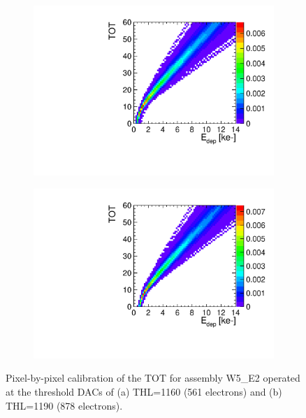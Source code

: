 \begin{figure}[htbp] \centering
  \begin{subfigure}[b]{0.45\textwidth}
    \includegraphics[width=\textwidth]{./figures/Calibration/TOTcalibration_W0005_E02_thresh1160.pdf}
    \caption{}
  \end{subfigure} \hfill
  \begin{subfigure}[b]{0.45\textwidth}
    \includegraphics[width=\textwidth]{./figures/Calibration/TOTcalibration_W0005_E02_thresh1190.pdf}
    \caption{}
  \end{subfigure}
  \caption{Pixel-by-pixel calibration of the TOT for assembly W5\_E2
    operated at the threshold DACs of (a) THL=1160 (561 electrons) and
    (b) THL=1190 (878 electrons).}
  \label{fig:TOTcalib_55GNDGR100}
\end{figure}

